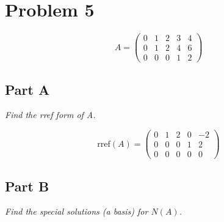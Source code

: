 \documentclass{article}
\begin{document}
\section*{Problem 5}

$$ A = \begin{pmatrix}
    0 & 1 & 2 & 3 & 4 \\
    0 & 1 & 2 & 4 & 6 \\
    0 & 0 & 0 & 1 & 2
\end{pmatrix} $$

\subsection*{Part A}

\textit{Find the rref form of A.}

\bigbreak

$$ \mathrm{rref} (A) = \begin{pmatrix}
    0 & 1 & 2 & 0 & -2 \\
    0 & 0 & 0 & 1 & 2 \\
    0 & 0 & 0 & 0 & 0
\end{pmatrix} $$

\subsection*{Part B}

\textit{Find the special solutions (a basis) for $N(A)$.}

\bigbreak
\end{document}

